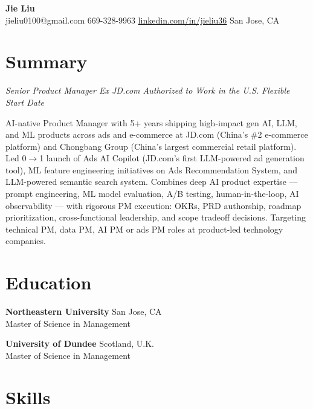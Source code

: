 \documentclass[10pt, letterpaper]{article}
\newcommand{\linkedinlink}[2]{\href{#1}{\textcolor{accent}{\uline{#2}}}}
\begin{document}
\begin{center}
    {\LARGE\bfseries\color{primary} Jie Liu}\\[3pt]
    \small
    jieliu0100@gmail.com \textbar{}
    669-328-9963 \textbar{}
    \linkedinlink{https://www.linkedin.com/in/jieliu36/}{linkedin.com/in/jieliu36} \textbar{}
    San Jose, CA
\end{center}

\section{Summary}

\textit{Senior Product Manager \textbar{} Ex JD.com \textbar{} Authorized to Work in the U.S. \textbar{} Flexible Start Date}

AI-native Product Manager with 5+ years shipping high-impact gen AI, LLM, and ML products across ads and e-commerce at JD.com (China's \#2 e-commerce platform) and Chongbang Group (China's largest commercial retail platform). Led 0$\rightarrow$1 launch of Ads AI Copilot (JD.com's first LLM-powered ad generation tool), ML feature engineering initiatives on Ads Recommendation System, and LLM-powered semantic search system. Combines deep AI product expertise --- prompt engineering, ML model evaluation, A/B testing, human-in-the-loop, AI observability --- with rigorous PM execution: OKRs, PRD authorship, roadmap prioritization, cross-functional leadership, and scope tradeoff decisions. Targeting technical PM, data PM, AI PM or ads PM roles at product-led technology companies.

\section{Education}

\textbf{Northeastern University} \hfill San Jose, CA\\
Master of Science in Management

\smallskip

\textbf{University of Dundee} \hfill Scotland, U.K.\\
Master of Science in Management

\section{Skills}
\end{document}
